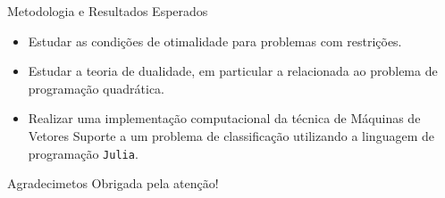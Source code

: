 \documentclass{beamer}
\theoremstyle{definition}%
\begin{document}
\begin{frame}{Metodologia e Resultados Esperados}
\begin{itemize}
	\item Estudar as condições de otimalidade para problemas com restrições.

	\item Estudar a teoria de dualidade, em particular a relacionada ao problema de programação quadrática.

	\item Realizar uma implementação computacional da técnica de Máquinas de Vetores Suporte a um problema de classificação utilizando a linguagem de programação \texttt{Julia}.
\end{itemize}
\end{frame}


\begin{frame}{Agradecimetos}
\centering
\Large{Obrigada pela atenção!}
\end{frame}


\begin{frame}
\printbibliography
\end{frame}
\end{document}
